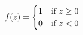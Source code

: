 \documentclass[preview]{standalone}
\begin{document}
\begin{align*}
\special{dvisvgm:raw <g id='unique000'>}f(z) = \begin{cases} 1 & \text{if } z \geq 0 \\ 0 & \text{if } z < 0 \end{cases}\special{dvisvgm:raw </g>}
\end{align*}
\end{document}
